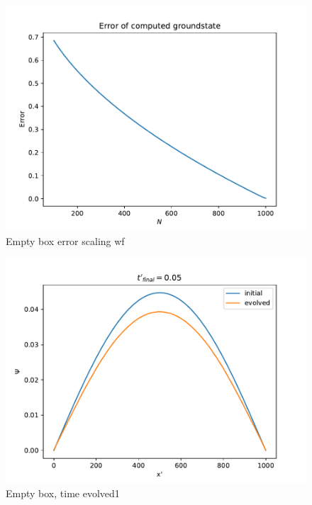 \documentclass{article}
\begin{document}
\begin{figure}
    \includegraphics[width=\linewidth]{./media/wf_error_scaling.pdf}
    \caption{Empty box error scaling wf}
    \label{fig:box-eigenstates-error}
\end{figure}

\begin{figure}
    \includegraphics[width=\linewidth]{./media/time_evolve_emptybox_1.pdf}
    \caption{Empty box, time evolved1}
    \label{fig:box-time-evolved1}
\end{figure}
\end{document}
